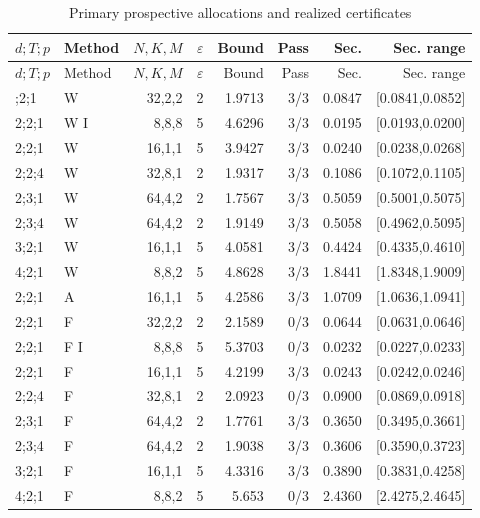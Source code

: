 {\small
\setlength{\tabcolsep}{3pt}
\begin{longtable}{@{}llrrrrrr@{}}
\caption{Primary prospective allocations and realized certificates}\label{tab:services50}\\
\toprule
$d;T;p$ & Method & $N,K,M$ & $\varepsilon$ & Bound & Pass & Sec. & Sec. range \\
\midrule
\endfirsthead
\toprule
$d;T;p$ & Method & $N,K,M$ & $\varepsilon$ & Bound & Pass & Sec. & Sec. range \\
\midrule
\endhead
\bottomrule
\endfoot
2;2;1 & W & 32,2,2 & 2 & 1.9713 & 3/3 & 0.0847 & [0.0841,0.0852] \\
2;2;1 & W I & 8,8,8 & 5 & 4.6296 & 3/3 & 0.0195 & [0.0193,0.0200] \\
2;2;1 & W & 16,1,1 & 5 & 3.9427 & 3/3 & 0.0240 & [0.0238,0.0268] \\
2;2;4 & W & 32,8,1 & 2 & 1.9317 & 3/3 & 0.1086 & [0.1072,0.1105] \\
2;3;1 & W & 64,4,2 & 2 & 1.7567 & 3/3 & 0.5059 & [0.5001,0.5075] \\
2;3;4 & W & 64,4,2 & 2 & 1.9149 & 3/3 & 0.5058 & [0.4962,0.5095] \\
3;2;1 & W & 16,1,1 & 5 & 4.0581 & 3/3 & 0.4424 & [0.4335,0.4610] \\
4;2;1 & W & 8,8,2 & 5 & 4.8628 & 3/3 & 1.8441 & [1.8348,1.9009] \\
2;2;1 & A & 16,1,1 & 5 & 4.2586 & 3/3 & 1.0709 & [1.0636,1.0941] \\
2;2;1 & F & 32,2,2 & 2 & 2.1589 & 0/3 & 0.0644 & [0.0631,0.0646] \\
2;2;1 & F I & 8,8,8 & 5 & 5.3703 & 0/3 & 0.0232 & [0.0227,0.0233] \\
2;2;1 & F & 16,1,1 & 5 & 4.2199 & 3/3 & 0.0243 & [0.0242,0.0246] \\
2;2;4 & F & 32,8,1 & 2 & 2.0923 & 0/3 & 0.0900 & [0.0869,0.0918] \\
2;3;1 & F & 64,4,2 & 2 & 1.7761 & 3/3 & 0.3650 & [0.3495,0.3661] \\
2;3;4 & F & 64,4,2 & 2 & 1.9038 & 3/3 & 0.3606 & [0.3590,0.3723] \\
3;2;1 & F & 16,1,1 & 5 & 4.3316 & 3/3 & 0.3890 & [0.3831,0.4258] \\
4;2;1 & F & 8,8,2 & 5 & 5.653 & 0/3 & 2.4360 & [2.4275,2.4645] \\
\end{longtable}
}
